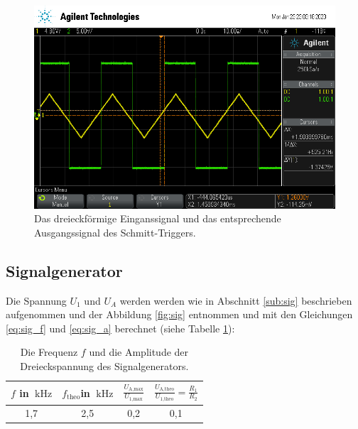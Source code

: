 \begin{figure}
    \centering
    \includegraphics[width=\textwidth]{usb/Trigger.png}
    \caption{ Das dreieckförmige Einganssignal und das entsprechende Ausgangssignal
    des Schmitt-Triggers.}
    \label{fig:schmitt}
\end{figure}
\FloatBarrier
\subsection{Signalgenerator}
Die Spannung $U_1$ und $U_A$ werden werden wie in Abschnitt \ref{sub:sig} beschrieben aufgenommen
und der Abbildung \ref{fig:sig} entnommen 
und mit den Gleichungen \ref{eq:sig_f} und \ref{eq:sig_a} berechnet (siehe Tabelle \ref{tab:sig}):

\begin{table}
    \centering
    \begin{tabular}{c c c c}
        \toprule
        $f$ in $\qty{}{\kilo\hertz}$ & $f_\text{theo}$in $\qty{}{\kilo\hertz}$ 
        & $\frac{U_\text{A,max}}{U_\text{1,max}}$ & $\frac{U_\text{A,theo}}{U_\text{1,theo}} = \frac{R_1}{R_2}$  \\
        \midrule   
        1,7 & 2,5 & 0,2 & 0,1 \\
        \bottomrule   
    \end{tabular}
    \caption{Die Frequenz $f$ und die Amplitude der Dreieckspannung des Signalgenerators.}
    \label{tab:sig}
\end{table}


